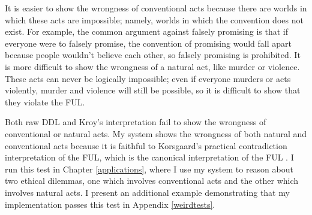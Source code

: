 \begin{isabellebody}
\begin{isamarkuptext}
It is easier to show the wrongness of conventional acts because there are worlds
in which these acts are impossible; namely, worlds in which the convention does not exist. For example, 
the common argument against falsely promising is that if everyone were to falsely promise, the convention 
of promising would fall apart because people wouldn't believe each other, so falsely promising is prohibited. 
It is more difficult to show the wrongness of a natural act, like murder or violence. These acts can 
never be logically impossible; even if everyone murders or acts violently, murder and violence will 
still be possible, so it is difficult to show that they violate the FUL. 

Both raw DDL and Kroy's interpretation fail to show the wrongness of conventional or natural acts. 
My system shows the wrongness of both natural and conventional acts because it is faithful to Korsgaard's 
practical contradiction interpretation of the FUL, which is the canonical interpretation of the 
FUL \citep{ebelsduggan, KorsgaardFUL}. I run this test in Chapter \ref{applications}, where I
use my system to reason about two ethical dilemmas, one which involves conventional acts and the other which
involves natural acts. I present an additional example demonstrating that my implementation passes
this test in Appendix \ref{weirdtests}.%
\end{isamarkuptext}\isamarkuptrue%
%
\isadelimproof
%
\endisadelimproof
%
\isatagproof
%
\endisatagproof
{\isafoldproof}%
%
\isadelimproof
%
\endisadelimproof
%
\isadelimtheory
%
\endisadelimtheory
%
\isatagtheory
%
\endisatagtheory
{\isafoldtheory}%
%
\isadelimtheory
%
\endisadelimtheory
%
\end{isabellebody}%
\endinput
